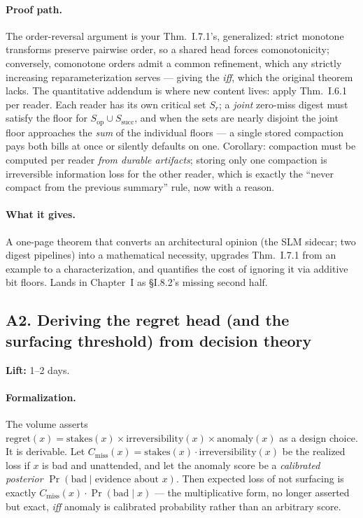 \documentclass[11pt,a4paper]{article}
\newcommand{\lift}[1]{\noindent\textbf{Lift:} #1.}
\newcommand{\gives}{\paragraph{What it gives.}}
\newcommand{\form}{\paragraph{Formalization.}}
\newcommand{\proofpath}{\paragraph{Proof path.}}
\begin{document}
\proofpath The order-reversal argument is your Thm.~I.7.1's, generalized: strict monotone transforms preserve pairwise order, so a shared head forces comonotonicity; conversely, comonotone orders admit a common refinement, which any strictly increasing reparameterization serves --- giving the \emph{iff}, which the original theorem lacks. The quantitative addendum is where new content lives: apply Thm.~I.6.1 per reader. Each reader has its own critical set $S_r$; a \emph{joint} zero-miss digest must satisfy the floor for $S_{\mathrm{op}} \cup S_{\mathrm{succ}}$, and when the sets are nearly disjoint the joint floor approaches the \emph{sum} of the individual floors --- a single stored compaction pays both bills at once or silently defaults on one. Corollary: compaction must be computed per reader \emph{from durable artifacts}; storing only one compaction is irreversible information loss for the other reader, which is exactly the ``never compact from the previous summary'' rule, now with a reason.

\gives A one-page theorem that converts an architectural opinion (the SLM sidecar; two digest pipelines) into a mathematical necessity, upgrades Thm.~I.7.1 from an example to a characterization, and quantifies the cost of ignoring it via additive bit floors. Lands in Chapter~I as \S I.8.2's missing second half.

\subsection{A2. Deriving the regret head (and the surfacing threshold) from decision theory}
\lift{1--2 days}

\form The volume asserts $\mathrm{regret}(x) = \mathrm{stakes}(x)\times\mathrm{irreversibility}(x)\times\mathrm{anomaly}(x)$ as a design choice. It is derivable. Let $C_{\mathrm{miss}}(x) = \mathrm{stakes}(x)\cdot\mathrm{irreversibility}(x)$ be the realized loss if $x$ is bad and unattended, and let the anomaly score be a \emph{calibrated posterior} $\Pr(\mathrm{bad}\mid \text{evidence about } x)$. Then expected loss of not surfacing is exactly $C_{\mathrm{miss}}(x)\cdot\Pr(\mathrm{bad}\mid x)$ --- the multiplicative form, no longer asserted but exact, \emph{iff} anomaly is calibrated probability rather than an arbitrary score.
\end{document}
